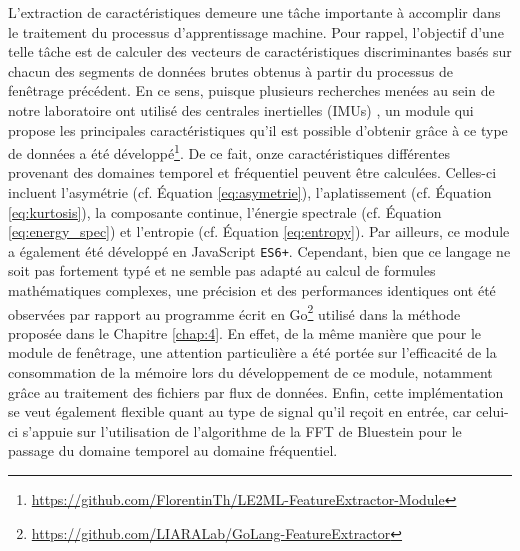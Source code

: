 L'extraction de caractéristiques demeure une tâche importante à accomplir dans le traitement du processus d'apprentissage machine. Pour rappel, l'objectif d'une telle tâche est de calculer des vecteurs de caractéristiques discriminantes basés sur chacun des segments de données brutes obtenus à partir du processus de fenêtrage précédent. En ce sens, puisque plusieurs recherches menées au sein de notre laboratoire ont utilisé des centrales inertielles (\acsp{IMU}) \citep{Thullier2017,Thullier2018,Chapron2018}, un module qui propose les principales caractéristiques qu'il est possible d'obtenir grâce à ce type de données a été développé\footnote{\url{https://github.com/FlorentinTh/LE2ML-FeatureExtractor-Module}}. De ce fait, onze caractéristiques différentes provenant des domaines temporel et fréquentiel peuvent être calculées. Celles-ci incluent l'asymétrie (cf. Équation \ref{eq:asymetrie}), l'aplatissement (cf. Équation \ref{eq:kurtosis}), la composante continue, l'énergie spectrale (cf. Équation \ref{eq:energy_spec}) et l'entropie (cf. Équation \ref{eq:entropy}). Par ailleurs, ce module a également été développé en JavaScript \texttt{ES6+}. Cependant, bien que ce langage ne soit pas fortement typé et ne semble pas adapté au calcul de formules mathématiques complexes, une précision et des performances identiques ont été observées par rapport au programme écrit en Go\footnote{\url{https://github.com/LIARALab/GoLang-FeatureExtractor}} utilisé dans la méthode proposée dans le Chapitre \ref{chap:4}. En effet, de la même manière que pour le module de fenêtrage, une attention particulière a été portée sur l'efficacité de la consommation de la mémoire lors du développement de ce module, notamment grâce au traitement des fichiers par flux de données. Enfin, cette implémentation se veut également flexible quant au type de signal qu'il reçoit en entrée, car celui-ci s'appuie sur l'utilisation de l'algorithme de la \acs{FFT} de Bluestein \citep{Bluestein1970} pour le passage du domaine temporel au domaine fréquentiel.

